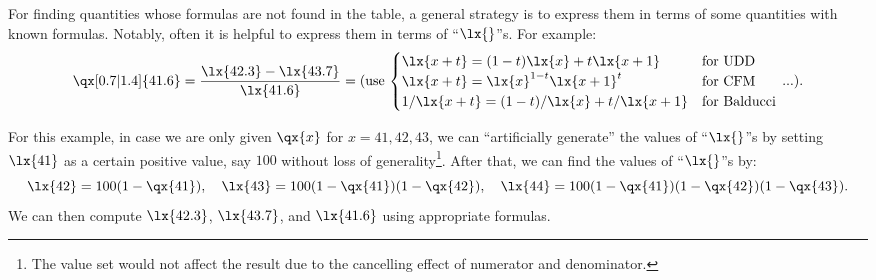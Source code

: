 \begin{enumerate}
For finding quantities whose formulas are not found in the table, a general
strategy is to express them in terms of some quantities with known formulas.
Notably, often it is helpful to express them in terms of ``\(\lx{}\)''s. For
example:
\[
\displaystyle \qx[0.7|1.4]{41.6}=\frac{\lx{42.3}-\lx{43.7}}{\lx{41.6}}
=\text{(use \(
\begin{cases}
\lx{x+t}=(1-t)\lx{x}+t\lx{x+1}&\text{for UDD} \\
\lx{x+t}=\lx{x}^{1-t}\lx{x+1}^{t}&\text{for CFM} \\
1/\lx{x+t}=(1-t)/\lx{x}+t/\lx{x+1}&\text{for Balducci}
\end{cases}
\) ...)}.
\]
\begin{note}
For this example, in case we are only given \(\qx{x}\) for \(x=41,42,43\), we
can ``artificially generate'' the values of ``\(\lx{}\)''s by setting
\(\lx{41}\) as a certain positive value, say \(100\) without loss of
generality\footnote{The value set would not affect the result due to the
cancelling effect of numerator and denominator.}. After that, we can find the
values of ``\(\lx{}\)''s by:
\[
\lx{42}=100(1-\qx{41}),\quad
\lx{43}=100(1-\qx{41})(1-\qx{42}),\quad
\lx{44}=100(1-\qx{41})(1-\qx{42})(1-\qx{43}).
\]
We can then compute \(\lx{42.3}\), \(\lx{43.7}\), and \(\lx{41.6}\) using
appropriate formulas.
\end{note}
\end{enumerate}
